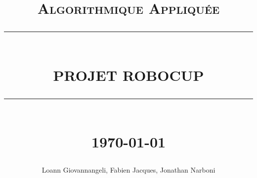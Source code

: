 \documentclass[12pt]{article}
\newcommand{\HRule}[1]{\rule{\linewidth}{#1}}
\begin{document}
\title{ \normalsize \textsc{Algorithmique Appliquée}
		\\ [2.0cm]
		\HRule{0.5pt} \\
		\LARGE \textbf{\uppercase{Projet RoboCup}}
		\HRule{2pt} \\ [0.5cm]
		\normalsize \today \vspace*{5\baselineskip}}

\date{}

\author{
		Loann Giovannangeli, Fabien Jacques, Jonathan Narboni}

\maketitle
\renewcommand{\contentsname}{Sommaire}
\newpage
\tableofcontents
\newpage

\sectionfont{\scshape}






\end{document}
